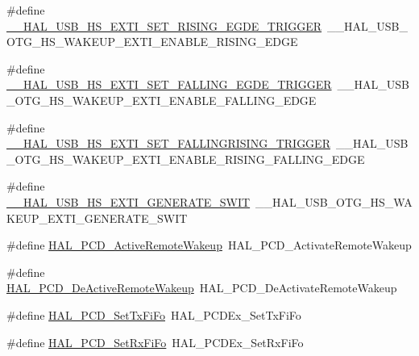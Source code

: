 \begin{DoxyCompactItemize}
\item 
\#define \hyperlink{group___h_a_l___u_s_b___aliased___macros_ga146bc9a6b749f5745487f41bae1bff29}{\+\_\+\+\_\+\+H\+A\+L\+\_\+\+U\+S\+B\+\_\+\+H\+S\+\_\+\+E\+X\+T\+I\+\_\+\+S\+E\+T\+\_\+\+R\+I\+S\+I\+N\+G\+\_\+\+E\+G\+D\+E\+\_\+\+T\+R\+I\+G\+G\+ER}~\+\_\+\+\_\+\+H\+A\+L\+\_\+\+U\+S\+B\+\_\+\+O\+T\+G\+\_\+\+H\+S\+\_\+\+W\+A\+K\+E\+U\+P\+\_\+\+E\+X\+T\+I\+\_\+\+E\+N\+A\+B\+L\+E\+\_\+\+R\+I\+S\+I\+N\+G\+\_\+\+E\+D\+GE
\item 
\#define \hyperlink{group___h_a_l___u_s_b___aliased___macros_gaa70bce4e16d41ad8d3e0232b0c235c80}{\+\_\+\+\_\+\+H\+A\+L\+\_\+\+U\+S\+B\+\_\+\+H\+S\+\_\+\+E\+X\+T\+I\+\_\+\+S\+E\+T\+\_\+\+F\+A\+L\+L\+I\+N\+G\+\_\+\+E\+G\+D\+E\+\_\+\+T\+R\+I\+G\+G\+ER}~\+\_\+\+\_\+\+H\+A\+L\+\_\+\+U\+S\+B\+\_\+\+O\+T\+G\+\_\+\+H\+S\+\_\+\+W\+A\+K\+E\+U\+P\+\_\+\+E\+X\+T\+I\+\_\+\+E\+N\+A\+B\+L\+E\+\_\+\+F\+A\+L\+L\+I\+N\+G\+\_\+\+E\+D\+GE
\item 
\#define \hyperlink{group___h_a_l___u_s_b___aliased___macros_ga112c32a1dea904f42275b7067ca4f4d1}{\+\_\+\+\_\+\+H\+A\+L\+\_\+\+U\+S\+B\+\_\+\+H\+S\+\_\+\+E\+X\+T\+I\+\_\+\+S\+E\+T\+\_\+\+F\+A\+L\+L\+I\+N\+G\+R\+I\+S\+I\+N\+G\+\_\+\+T\+R\+I\+G\+G\+ER}~\+\_\+\+\_\+\+H\+A\+L\+\_\+\+U\+S\+B\+\_\+\+O\+T\+G\+\_\+\+H\+S\+\_\+\+W\+A\+K\+E\+U\+P\+\_\+\+E\+X\+T\+I\+\_\+\+E\+N\+A\+B\+L\+E\+\_\+\+R\+I\+S\+I\+N\+G\+\_\+\+F\+A\+L\+L\+I\+N\+G\+\_\+\+E\+D\+GE
\item 
\#define \hyperlink{group___h_a_l___u_s_b___aliased___macros_ga5439cec1ebe6cc15a3a9d3f30f9fa617}{\+\_\+\+\_\+\+H\+A\+L\+\_\+\+U\+S\+B\+\_\+\+H\+S\+\_\+\+E\+X\+T\+I\+\_\+\+G\+E\+N\+E\+R\+A\+T\+E\+\_\+\+S\+W\+IT}~\+\_\+\+\_\+\+H\+A\+L\+\_\+\+U\+S\+B\+\_\+\+O\+T\+G\+\_\+\+H\+S\+\_\+\+W\+A\+K\+E\+U\+P\+\_\+\+E\+X\+T\+I\+\_\+\+G\+E\+N\+E\+R\+A\+T\+E\+\_\+\+S\+W\+IT
\item 
\#define \hyperlink{group___h_a_l___u_s_b___aliased___macros_gaf7a3fc7d87b9ef4947082e8bba921480}{H\+A\+L\+\_\+\+P\+C\+D\+\_\+\+Active\+Remote\+Wakeup}~H\+A\+L\+\_\+\+P\+C\+D\+\_\+\+Activate\+Remote\+Wakeup
\item 
\#define \hyperlink{group___h_a_l___u_s_b___aliased___macros_ga3aa67b4ed925bf6e4f9f22054037e243}{H\+A\+L\+\_\+\+P\+C\+D\+\_\+\+De\+Active\+Remote\+Wakeup}~H\+A\+L\+\_\+\+P\+C\+D\+\_\+\+De\+Activate\+Remote\+Wakeup
\item 
\#define \hyperlink{group___h_a_l___u_s_b___aliased___macros_ga7583d6ad8bc46cf004c4e7d4d75a29a4}{H\+A\+L\+\_\+\+P\+C\+D\+\_\+\+Set\+Tx\+Fi\+Fo}~H\+A\+L\+\_\+\+P\+C\+D\+Ex\+\_\+\+Set\+Tx\+Fi\+Fo
\item 
\#define \hyperlink{group___h_a_l___u_s_b___aliased___macros_gaa57fb6445f12a2e697a1f61e0b748c4b}{H\+A\+L\+\_\+\+P\+C\+D\+\_\+\+Set\+Rx\+Fi\+Fo}~H\+A\+L\+\_\+\+P\+C\+D\+Ex\+\_\+\+Set\+Rx\+Fi\+Fo
\end{DoxyCompactItemize}


